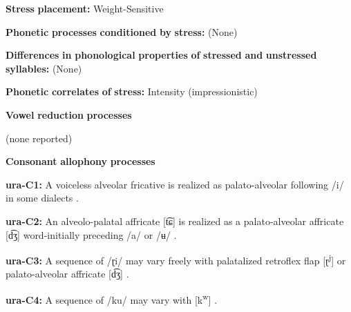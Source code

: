 \documentclass[output=paper]{langsci/langscibook}
\begin{document}
\begin{styleBody}
\textbf{Stress} \textbf{placement:} Weight-Sensitive
\end{styleBody}

\begin{styleBody}
\textbf{Phonetic} \textbf{processes} \textbf{conditioned} \textbf{by} \textbf{stress:} (None)
\end{styleBody}

\begin{styleBody}
\textbf{Differences} \textbf{in} \textbf{phonological} \textbf{properties} \textbf{of} \textbf{stressed} \textbf{and} \textbf{unstressed} \textbf{syllables:} (None)
\end{styleBody}

\begin{styleBody}
\textbf{Phonetic} \textbf{correlates} \textbf{of} \textbf{stress:} Intensity (impressionistic)
\end{styleBody}

\begin{styleBody}
\textbf{Vowel} \textbf{reduction} \textbf{processes}
\end{styleBody}

\begin{styleBody}
(none reported)
\end{styleBody}

\begin{styleBody}
\textbf{Consonant} \textbf{allophony} \textbf{processes}
\end{styleBody}

\begin{styleBody}
\textbf{ura-C1:} A voiceless alveolar fricative is realized as palato-alveolar following /i/ in some dialects \citep[38]{Olawsky2006}.
\end{styleBody}

\begin{styleBody}
\textbf{ura-C2:} An alveolo-palatal affricate [t͡ɕ] is realized as a palato-alveolar affricate [d͡ʒ] word-initially preceding /a/ or /ʉ/ \citep[39]{Olawsky2006}.
\end{styleBody}

\begin{styleBody}
\textbf{ura-C3:} A sequence of /ɽi/ may vary freely with palatalized retroflex flap [ɽ\textsuperscript{j}] or palato-alveolar affricate [d͡ʒ] \citep[71]{Olawsky2006}.
\end{styleBody}

\begin{styleBody}
\textbf{ura-C4:} A sequence of /ku/ may vary with [k\textsuperscript{w}] \citep[37]{Olawsky2006}.
\end{styleBody}
\end{document}
